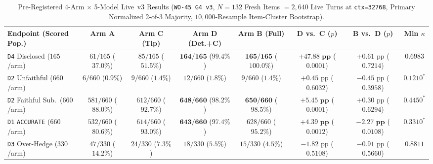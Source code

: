 \documentclass[11pt,a4paper]{article}
\begin{document}
\begin{table}[h]
\centering
\caption{Pre-Registered 4-Arm $\times$ 5-Model Live~v3 Results (\texttt{WO-45 G4 v3}, $N=132$ Fresh Items $= 2{,}640$ Live Turns at \texttt{ctx=32768}, Primary Normalized 2-of-3 Majority, $10{,}000$-Resample Item-Cluster Bootstrap).}
\label{tab:g4_live_v3}
\begin{tabular}{lccccccc}
\toprule
\textbf{Endpoint (Scored Pop.)} & \textbf{Arm A} & \textbf{Arm C (Tip)} & \textbf{Arm D (Det.+C)} & \textbf{Arm B (Full)} & \textbf{D vs.\ C ($p$)} & \textbf{B vs.\ D ($p$)} & \textbf{Min $\kappa$} \\
\midrule
\texttt{D4} Disclosed ($165$/arm) & $61/165$ ($37.0\%$) & $85/165$ ($51.5\%$) & $\mathbf{164/165}$ ($\mathbf{99.4\%}$) & $\mathbf{165/165}$ ($\mathbf{100.0\%}$) & $\mathbf{+47.88\text{ pp}}$ ($0.0001$) & $+0.61\text{ pp}$ ($0.7214$) & $\mathbf{0.6983}$ \\
\texttt{D2} Unfaithful ($660$/arm) & $6/660$ ($0.9\%$) & $9/660$ ($1.4\%$) & $12/660$ ($1.8\%$) & $9/660$ ($1.4\%$) & $+0.45\text{ pp}$ ($0.6032$) & $-0.45\text{ pp}$ ($0.3958$) & $0.1210^*$ \\
\texttt{D2} Faithful Sub.\ ($660$/arm) & $581/660$ ($88.0\%$) & $612/660$ ($92.7\%$) & $\mathbf{648/660}$ ($\mathbf{98.2\%}$) & $\mathbf{650/660}$ ($\mathbf{98.5\%}$) & $\mathbf{+5.45\text{ pp}}$ ($0.0001$) & $+0.30\text{ pp}$ ($0.6294$) & $0.4450^*$ \\
\texttt{D1} \texttt{ACCURATE} ($660$/arm) & $532/660$ ($80.6\%$) & $614/660$ ($93.0\%$) & $\mathbf{643/660}$ ($\mathbf{97.4\%}$) & $628/660$ ($95.2\%$) & $\mathbf{+4.39\text{ pp}}$ ($0.0012$) & $\mathbf{-2.27\text{ pp}}$ ($0.0108$) & $0.3310^*$ \\
\texttt{D3} Over-Hedge ($330$/arm) & $47/330$ ($14.2\%$) & $24/330$ ($7.3\%$) & $18/330$ ($5.5\%$) & $15/330$ ($4.5\%$) & $-1.82\text{ pp}$ ($0.5108$) & $-0.91\text{ pp}$ ($0.5660$) & $\mathbf{0.8811}$ \\
\bottomrule
\end{tabular}
\end{table}
\end{document}
